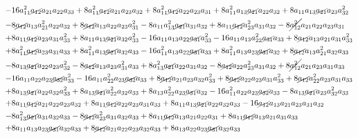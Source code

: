 \documentclass{article}
\begin{document}
\begin{equation}
\begin{aligned}
-& 16 a_{11}^{2} \cancel{a_{12}} a_{21} a_{22} a_{33} + 8 a_{11}^{2} \cancel{a_{12}} a_{21} a_{23} a_{32} + 8 a_{11}^{2} \cancel{a_{12}} a_{22} a_{23} a_{31} + 8 a_{11}^{2} a_{13} \cancel{a_{21}} a_{22} a_{32} + 8 a_{11} a_{13} \cancel{a_{21}} a_{23} a_{32}^{2} \\
-& 8 \cancel{a_{12}} a_{13} a_{21}^{2} a_{22} a_{32} + 8 \cancel{a_{12}} a_{13} a_{22} a_{23} a_{31}^{2} - 8 a_{11} a_{13}^{2} \cancel{a_{21}} a_{31} a_{32} + 8 a_{11} \cancel{a_{12}} a_{23}^{2} a_{31} a_{32} - 8 \cancel{a_{12}^{2}} a_{21} a_{22} a_{23} a_{31} \\
+& 8 a_{11} \cancel{a_{12}} a_{23} a_{31} a_{33}^{2} + 8 a_{11} a_{13} \cancel{a_{21}} a_{32} a_{33}^{2} - 16 a_{11} a_{13} a_{22} \cancel{a_{31}} a_{33}^{2} - 16 a_{11} a_{13} a_{22}^{2} \cancel{a_{31}} a_{33} + 8 \cancel{a_{12}} a_{13} a_{21} a_{31} a_{33}^{2} \\
+& 8 a_{11}^{2} \cancel{a_{12}} a_{23} a_{31} a_{33} + 8 a_{11}^{2} a_{13} \cancel{a_{21}} a_{32} a_{33} - 16 a_{11}^{2} a_{13} a_{22} \cancel{a_{31}} a_{33} + 8 a_{11}^{2} a_{13} a_{23} \cancel{a_{31}} a_{32} + 8 \cancel{a_{12}} a_{13} a_{21}^{2} a_{32} a_{33} \\
-& 8 a_{13} \cancel{a_{21}} a_{22} a_{23} a_{32}^{2} - 8 \cancel{a_{12}} a_{13} a_{23} a_{31}^{2} a_{33} + 8 a_{13}^{2} \cancel{a_{21}} a_{22} a_{31} a_{32} - 8 \cancel{a_{12}} a_{22} a_{23}^{2} a_{31} a_{32} + 8 \cancel{a_{12}^{2}} a_{21} a_{23} a_{31} a_{33} \\
-& 16 a_{11} a_{22} a_{23} \cancel{a_{32}} a_{33}^{2} - 16 a_{11} a_{22}^{2} a_{23} \cancel{a_{32}} a_{33} + 8 \cancel{a_{12}} a_{21} a_{23} a_{32} a_{33}^{2} + 8 \cancel{a_{12}} a_{22} a_{23} a_{31} a_{33}^{2} + 8 \cancel{a_{12}} a_{22}^{2} a_{23} a_{31} a_{33} \\
+& 8 a_{13} \cancel{a_{21}} a_{22} a_{32} a_{33}^{2} + 8 a_{13} \cancel{a_{21}} a_{22}^{2} a_{32} a_{33} + 8 a_{13} a_{22}^{2} a_{23} \cancel{a_{31}} a_{32} - 16 a_{11}^{2} a_{22} a_{23} \cancel{a_{32}} a_{33} - 8 a_{13} \cancel{a_{21}} a_{23} a_{32}^{2} a_{33} \\
+& 8 a_{11} \cancel{a_{12}} a_{21} a_{22} a_{23} a_{32} + 8 a_{11} \cancel{a_{12}} a_{22} a_{23} a_{31} a_{33} + 8 a_{11} a_{13} \cancel{a_{21}} a_{22} a_{32} a_{33} - 16 \cancel{a_{12}} a_{13} a_{21} a_{23} a_{31} a_{32} \\
-& 8 a_{13}^{2} \cancel{a_{21}} a_{31} a_{32} a_{33} - 8 \cancel{a_{12}} a_{23}^{2} a_{31} a_{32} a_{33} + 8 a_{11} \cancel{a_{12}} a_{13} a_{21} a_{22} a_{31} + 8 a_{11} \cancel{a_{12}} a_{13} a_{21} a_{31} a_{33} \\
+& 8 a_{11} a_{13} a_{23} \cancel{a_{31}} a_{32} a_{33} + 8 \cancel{a_{12}} a_{21} a_{22} a_{23} a_{32} a_{33} + 8 a_{13} a_{22} a_{23} \cancel{a_{31}} a_{32} a_{33}
\end{aligned}
\end{equation}
\end{document}
